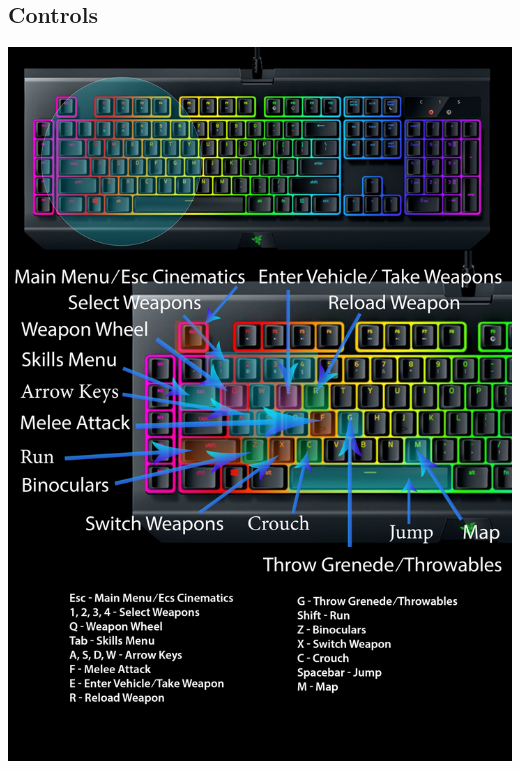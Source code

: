    \subsection{Controls}
        \includegraphics[width=\linewidth]{images/keyboard_layout.png} \newpage

